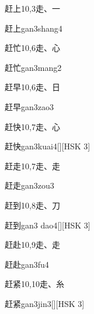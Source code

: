 \begin{entry}{赶上}{10,3}{⾛、⼀}
  \begin{phonetics}{赶上}{gan3shang4}
  \end{phonetics}
\end{entry}

\begin{entry}{赶忙}{10,6}{⾛、⼼}
  \begin{phonetics}{赶忙}{gan3mang2}
  \end{phonetics}
\end{entry}

\begin{entry}{赶早}{10,6}{⾛、⽇}
  \begin{phonetics}{赶早}{gan3zao3}
  \end{phonetics}
\end{entry}

\begin{entry}{赶快}{10,7}{⾛、⼼}
  \begin{phonetics}{赶快}{gan3kuai4}[][HSK 3]
  \end{phonetics}
\end{entry}

\begin{entry}{赶走}{10,7}{⾛、⾛}
  \begin{phonetics}{赶走}{gan3zou3}
  \end{phonetics}
\end{entry}

\begin{entry}{赶到}{10,8}{⾛、⼑}
  \begin{phonetics}{赶到}{gan3 dao4}[][HSK 3]
  \end{phonetics}
\end{entry}

\begin{entry}{赶赴}{10,9}{⾛、⾛}
  \begin{phonetics}{赶赴}{gan3fu4}
  \end{phonetics}
\end{entry}

\begin{entry}{赶紧}{10,10}{⾛、⽷}
  \begin{phonetics}{赶紧}{gan3jin3}[][HSK 3]
  \end{phonetics}
\end{entry}

